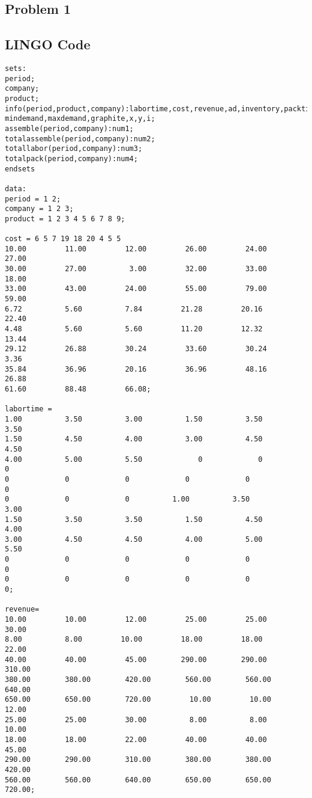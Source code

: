 \documentclass[12pt]{article}
\begin{document}
\begin{appendices}
 \renewcommand{\thesection}{\Alph{section}}
  \renewcommand{\thesubsection}{\Alph{section}. \Roman{subsection}}
\section{Problem 1}
\subsection{LINGO Code}
\begin{lstlisting}
sets:
period;
company;
product;
info(period,product,company):labortime,cost,revenue,ad,inventory,packtime,
mindemand,maxdemand,graphite,x,y,i;
assemble(period,company):num1;
totalassemble(period,company):num2;
totallabor(period,company):num3;
totalpack(period,company):num4;
endsets

data:
period = 1 2;
company = 1 2 3;
product = 1 2 3 4 5 6 7 8 9;

cost = 6 5 7 19 18 20 4 5 5
10.00         11.00         12.00         26.00         24.00         27.00
30.00         27.00          3.00         32.00         33.00         18.00
33.00         43.00         24.00         55.00         79.00         59.00
6.72          5.60          7.84         21.28         20.16         22.40
4.48          5.60          5.60         11.20         12.32         13.44
29.12         26.88         30.24         33.60         30.24          3.36
35.84         36.96         20.16         36.96         48.16         26.88
61.60         88.48         66.08;

labortime = 
1.00          3.50          3.00          1.50          3.50          3.50
1.50          4.50          4.00          3.00          4.50          4.50
4.00          5.00          5.50             0             0             0
0             0             0             0             0             0
0             0             0          1.00          3.50          3.00
1.50          3.50          3.50          1.50          4.50          4.00
3.00          4.50          4.50          4.00          5.00          5.50
0             0             0             0             0             0
0             0             0             0             0             0;

revenue=
10.00         10.00         12.00         25.00         25.00         30.00
8.00          8.00         10.00         18.00         18.00         22.00
40.00         40.00         45.00        290.00        290.00        310.00
380.00        380.00        420.00        560.00        560.00        640.00
650.00        650.00        720.00         10.00         10.00         12.00
25.00         25.00         30.00          8.00          8.00         10.00
18.00         18.00         22.00         40.00         40.00         45.00
290.00        290.00        310.00        380.00        380.00        420.00
560.00        560.00        640.00        650.00        650.00        720.00;


\end{lstlisting}
\end{appendices}
\end{document}
